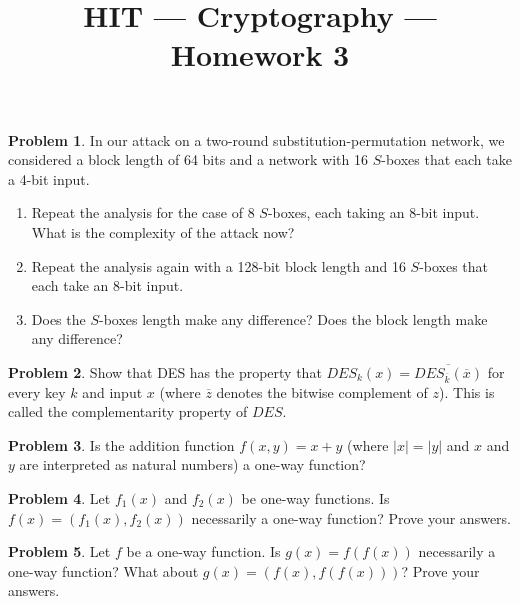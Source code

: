 \documentclass[11pt]{article}
\title{HIT --- Cryptography --- Homework 3}
\theoremstyle{definition}
\newtheorem{problem}{Problem}
\begin{document}
\maketitle

\begin{problem}
In our attack on a two-round substitution-permutation network, we considered a block length of 64 bits and a network with 16 $S$-boxes that each take a 4-bit input. 
\begin{enumerate}
\item Repeat the analysis for the case of 8 $S$-boxes, each taking an 8-bit input. What is the complexity of the attack now?
\item Repeat the analysis again with a 128-bit block length and 16 $S$-boxes that each take an 8-bit input.
\item Does the $S$-boxes length make any difference? Does the block length make any difference?
\end{enumerate}
\end{problem}

\begin{problem}
Show that DES has the property that $DES_k(x) = \overline{DES_{\overline{k}}(\overline{x})}$ for every key $k$ and input $x$ (where $\overline{z}$ denotes the bitwise complement of $z$). This is called the complementarity property of $DES$.
\end{problem}

\begin{problem}
Is the addition function $f(x, y) = x + y$ (where $|x| = |y|$ and $x$ and $y$ are interpreted as natural numbers) a one-way function?
\end{problem}

\begin{problem}
Let $f_{1}(x)$ and $f_{2}(x)$ be one-way functions. Is $f(x) = (f_{1}(x), f_{2}(x))$ necessarily a one-way function? Prove your answers.
\end{problem}

\begin{problem}
Let $f$ be a one-way function. Is $g(x) = f(f(x))$ necessarily a one-way function? What about $g(x) = (f(x),f(f(x)))$? Prove your answers.
\end{problem}
\end{document}
